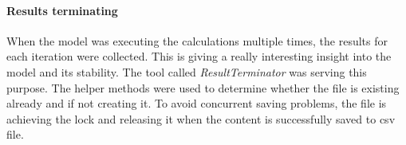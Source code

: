 \paragraph{Results terminating}\label{para:results-terminating}
When the model was executing the calculations multiple times, the results for each iteration were collected.
This is giving a really interesting insight into the model and its stability.
The tool called \mbox{\textit{ResultTerminator}} was serving this purpose.
The helper methods were used to determine whether the file is existing already and if not creating it.
To avoid concurrent saving problems, the file is achieving the lock and releasing it when the content is successfully saved to \gls{csv} file.
